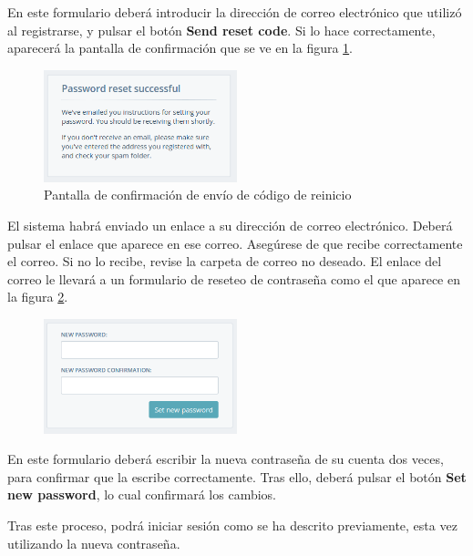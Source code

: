 En este formulario deberá introducir la dirección de correo electrónico que
utilizó al registrarse, y pulsar el botón \textbf{Send reset code}. Si lo hace
correctamente, aparecerá la pantalla de confirmación que se ve en la figura
\ref{fig:pantalla-reset-enviado}.

\begin{figure}[hbtp]
  \centering
  \includegraphics[width=0.5\textwidth]{apendice_manual_usuario/pantalla_reset_enviado.png}
  \caption{Pantalla de confirmación de envío de código de reinicio}
  \label{fig:pantalla-reset-enviado}
\end{figure}

El sistema habrá enviado un enlace a su dirección de correo electrónico. Deberá
pulsar el enlace que aparece en ese correo. Asegúrese de que recibe
correctamente el correo. Si no lo recibe, revise la carpeta de correo no
deseado. El enlace del correo le llevará a un formulario de reseteo de
contraseña como el que aparece en la figura \ref{fig:formulario-reset-2}.

\begin{figure}[hbtp]
  \centering
  \includegraphics[width=0.5\textwidth]{apendice_manual_usuario/general_formulario_reset_2.png}
  \caption{}
  \label{fig:formulario-reset-2}
\end{figure}

En este formulario deberá escribir la nueva contraseña de su cuenta dos veces,
para confirmar que la escribe correctamente. Tras ello, deberá pulsar el botón
\textbf{Set new password}, lo cual confirmará los cambios. 

Tras este proceso, podrá iniciar sesión como se ha descrito previamente, esta
vez utilizando la nueva contraseña.


